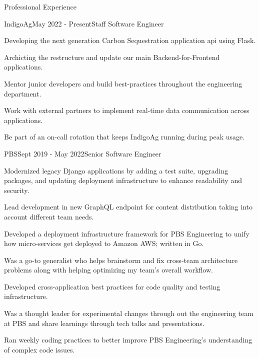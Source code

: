 \documentclass{bluefin_cv}
\begin{document}
\begin{bfcvSection}{Professional Experience}

\begin{bfcvWorkSubsection}{IndigoAg}{May 2022 - Present}{Staff Software Engineer}
\item Developing the next generation Carbon Sequestration application api using Flask.
\item Archicting the restructure and update our main Backend-for-Frontend applications.
\item Mentor junior developers and build best-practices throughout the engineering department.
\item Work with external partners to implement real-time data communication across applications.
\item Be part of an on-call rotation that keeps IndigoAg running during peak usage.
\end{bfcvWorkSubsection}

\begin{bfcvWorkSubsection}{PBS}{Sept 2019 - May 2022}{Senior Software Engineer}
\item Modernized legacy Django applications by adding a test suite, upgrading packages, and updating deployment infrastructure to enhance readability and security.
\item Lead development in new GraphQL endpoint for content distribution taking into account different team needs.
\item Developed a deployment infrastructure framework for PBS Engineering to unify how micro-services get deployed to Amazon AWS; written in Go.
\item Was a go-to generalist who helps brainstorm and fix cross-team architecture problems along with helping optimizing my team's overall workflow.
\item Developed cross-application best practices for code quality and testing infrastructure.
\item Was a thought leader for experimental changes through out the engineering team at PBS and share learnings through tech talks and presentations.
\item Ran weekly coding practices to better improve PBS Engineering's understanding of complex code issues.
\end{bfcvWorkSubsection}


\end{bfcvSection}
\end{document}
